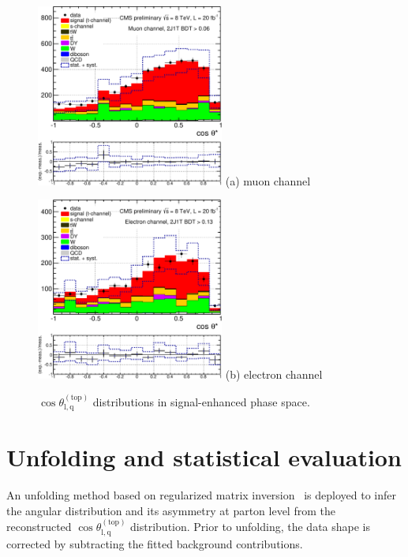 \documentclass[a4paper]{jpconf}
\newcommand{\costheta}[0]{\cos\theta_{\mathrm{l,q}}^{\mathrm{(top)}}}
\begin{document}
\begin{figure}[h]
\begin{center}
\begin{minipage}{7cm}
\includegraphics[height=6.0cm]{2j1t_cosTheta_mu-crop}
\center (a) muon channel
\end{minipage}\hspace{1cm}%
\begin{minipage}{7cm}
\includegraphics[height=6.0cm]{2j1t_cosTheta_el-crop}
\center (b) electron channel
\end{minipage} 
\caption{\label{fig:recocostheta}$\costheta$ distributions in signal-enhanced phase space.}
\vspace{-0.7cm}
\end{center}
\end{figure}

\section{Unfolding and statistical evaluation}
An unfolding method based on regularized matrix inversion~\cite{tunfold} is deployed to infer the angular distribution and its asymmetry at parton level from the reconstructed $\costheta$ distribution. Prior to unfolding, the data shape is corrected by subtracting the fitted background contributions.
\end{document}
